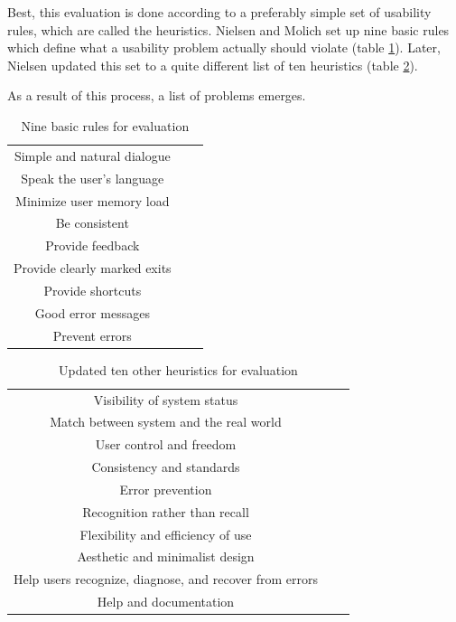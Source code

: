 \documentclass[sigchi]{acmart}
\begin{document}
Best, this  evaluation is done according to a preferably simple set of usability rules, which are called the heuristics. Nielsen and Molich set up nine basic rules which define what a usability problem actually should violate (table \ref{tab:9heur}). Later, Nielsen updated this set to a quite different list of ten heuristics (table \ref{tab:10heur}).

As a result of this process, a list of problems emerges.

\begin{table}
  \caption{Nine basic rules for evaluation}
  \label{tab:9heur}
  \begin{tabular}{ccl}
    \midrule
    Simple and natural dialogue\\
    Speak the user’s language\\
    Minimize user memory load\\
    Be consistent\\
    Provide feedback\\
    Provide clearly marked exits\\
    Provide shortcuts\\
    Good error messages\\
    Prevent errors\\
  \bottomrule
\end{tabular}
\end{table}

\begin{table}
  \caption{Updated ten other heuristics for evaluation}
  \label{tab:10heur}
  \begin{tabular}{ccl}
    \midrule
    Visibility of system status \\
    Match between system and the real world \\
    User control and freedom \\
    Consistency and standards \\
    Error prevention \\
    Recognition rather than recall \\
    Flexibility and efficiency of use \\
    Aesthetic and minimalist design \\
    Help users recognize, diagnose, and recover from errors \\
    Help and documentation \\
  \bottomrule
\end{tabular}
\end{table}
\end{document}
